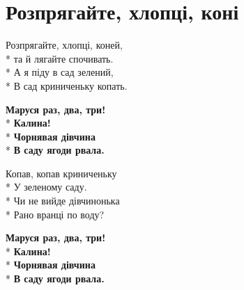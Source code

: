 \vspace{\fill}\newpage

\section{Розпрягайте, хлопці, коні}
\label{song:Розпрягайте,_хлопці,_коні}

\medskip

\begin{minipage}{\linewidth}
Розпрягайте, хлопці, коней,\\*
та й лягайте спочивать.\\*
А я піду в сад зелений,\\*
В сад криниченьку копать.\\
\end{minipage}\par\medskip\nobreak

\medskip

\begin{minipage}{\linewidth}
\hspace*{1.5em}\textbf{Маруся раз, два, три!}\\*
\hspace*{1.5em}\textbf{Калина!}\\*
\hspace*{1.5em}\textbf{Чорнявая дівчина}\\*
\hspace*{1.5em}\textbf{В саду ягоди рвала.}\\
\end{minipage}\par\medskip\nobreak

\medskip

\begin{minipage}{\linewidth}
Копав, копав криниченьку\\*
У зеленому саду.\\*
Чи не вийде дівчинонька\\*
Рано вранці по воду?\\
\end{minipage}\par\medskip\nobreak

\medskip

\begin{minipage}{\linewidth}
\hspace*{1.5em}\textbf{Маруся раз, два, три!}\\*
\hspace*{1.5em}\textbf{Калина!}\\*
\hspace*{1.5em}\textbf{Чорнявая дівчина}\\*
\hspace*{1.5em}\textbf{В саду ягоди рвала.}\\
\end{minipage}\par\medskip\nobreak

